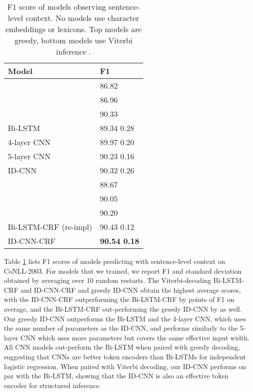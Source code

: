 \documentclass[11pt,letterpaper]{article}
\begin{document}
\begin{table}
\begin{tabular}{ll}
    Model & F1 \\ \hline \hline
    \citet{ratinov2009design} & 86.82 \\ 
    \citet{collobert2011natural} & 86.96 \\ 
    \citet{lample2016neural} & 90.33 \\ \hline 
    Bi-LSTM & 89.34  0.28 \\
    4-layer CNN & 89.97  0.20 \\
    5-layer CNN & 90.23  0.16 \\
    ID-CNN & 90.32  0.26 \\ \hline\hline
    \citet{collobert2011natural} & 88.67 \\
    \citet{passos2014lexicon} & 90.05 \\
    \citet{lample2016neural} & 90.20 \\ \hline 
    Bi-LSTM-CRF (re-impl) & 90.43  0.12 \\
    ID-CNN-CRF & {\bf 90.54  0.18} \\
  \end{tabular}

  \caption{F1 score of models observing sentence-level context. No models use character embeddings or lexicons. Top models are greedy, bottom models use Viterbi inference \label{sentence-summary}.}
  
\end{table}
Table \ref{sentence-summary} lists F1 scores of models predicting with sentence-level context on CoNLL-2003. For models that we trained, we report F1 and standard deviation obtained by averaging over 10 random restarts. The Viterbi-decoding Bi-LSTM-CRF and ID-CNN-CRF and greedy ID-CNN obtain the highest average scores, with the ID-CNN-CRF outperforming the Bi-LSTM-CRF by  points of F1 on average, and the Bi-LSTM-CRF out-performing the greedy ID-CNN by  as well. Our greedy ID-CNN outperforms the Bi-LSTM and the 4-layer CNN, which uses the same number of parameters as the ID-CNN, and performs similarly to the 5-layer CNN which uses more parameters but covers the same effective input width. All CNN models out-perform the Bi-LSTM when paired with greedy decoding, suggesting that CNNs are better token encoders than Bi-LSTMs for independent logistic regression. When paired with Viterbi decoding, our ID-CNN performs on par with the Bi-LSTM, showing that the ID-CNN is also an effective token encoder for structured inference.
\end{document}
